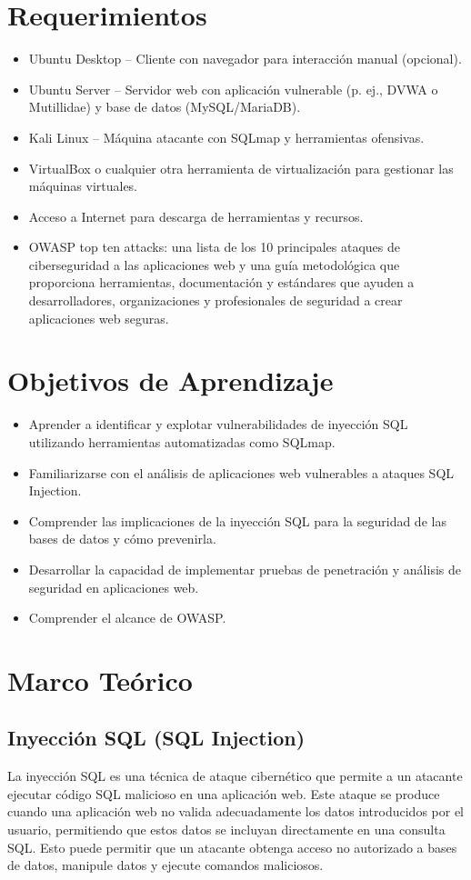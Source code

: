\documentclass[12pt,a4paper]{article}
\begin{document}
\section{Requerimientos}
\begin{itemize}
    \item Ubuntu Desktop – Cliente con navegador para interacción manual (opcional).
    \item Ubuntu Server – Servidor web con aplicación vulnerable (p. ej., DVWA o Mutillidae) y base de datos (MySQL/MariaDB).
    \item Kali Linux – Máquina atacante con SQLmap y herramientas ofensivas.
    \item VirtualBox o cualquier otra herramienta de virtualización para gestionar las máquinas virtuales.
    \item Acceso a Internet para descarga de herramientas y recursos.
    \item OWASP top ten attacks: una lista de los 10 principales ataques de ciberseguridad a las aplicaciones web y una guía metodológica que proporciona herramientas, documentación y estándares que ayuden a desarrolladores, organizaciones y profesionales de seguridad a crear aplicaciones web seguras.
\end{itemize}

\section{Objetivos de Aprendizaje}
\begin{itemize}
    \item Aprender a identificar y explotar vulnerabilidades de inyección SQL utilizando herramientas automatizadas como SQLmap.
    \item Familiarizarse con el análisis de aplicaciones web vulnerables a ataques SQL Injection.
    \item Comprender las implicaciones de la inyección SQL para la seguridad de las bases de datos y cómo prevenirla.
    \item Desarrollar la capacidad de implementar pruebas de penetración y análisis de seguridad en aplicaciones web.
    \item Comprender el alcance de OWASP.
\end{itemize}

\section{Marco Teórico}
\subsection{Inyección SQL (SQL Injection)}
La inyección SQL es una técnica de ataque cibernético que permite a un atacante ejecutar código SQL malicioso en una aplicación web. Este ataque se produce cuando una aplicación web no valida adecuadamente los datos introducidos por el usuario, permitiendo que estos datos se incluyan directamente en una consulta SQL. Esto puede permitir que un atacante obtenga acceso no autorizado a bases de datos, manipule datos y ejecute comandos maliciosos.
\end{document}
